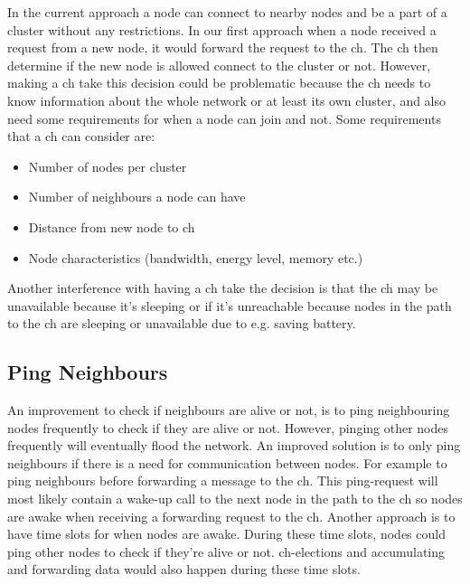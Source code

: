 \documentclass[USenglish]{uit-thesis}
\begin{document}
In the current approach a node can connect to nearby nodes and be a part of a cluster without any restrictions. In our first approach when a node received a request from a new node, it would forward the request to the \gls{ch}. The \gls{ch} then determine if the new node is allowed connect to the cluster or not. However, making a \gls{ch} take this decision could be problematic because the \gls{ch} needs to know information about the whole network or at least its own cluster, and also need some requirements for when a node can join and not. Some requirements that a \gls{ch} can consider are:

\begin{itemize}
\item Number of nodes per cluster
\item Number of neighbours a node can have
\item Distance from new node to \gls{ch}
\item Node characteristics (bandwidth, energy level, memory etc.)
\end{itemize}

Another interference with having a \gls{ch} take the decision is that the \gls{ch} may be unavailable because it's sleeping or if it's unreachable because nodes in the path to the \gls{ch} are sleeping or unavailable due to e.g. saving battery. 

\subsection{Ping Neighbours} \label{disc:ping_nodes}
An improvement to check if neighbours are alive or not, is to ping neighbouring nodes frequently to check if they are alive or not. However, pinging other nodes frequently will eventually flood the network. An improved solution is to only ping neighbours if there is a need for communication between nodes. For example to ping neighbours before forwarding a message to the \gls{ch}. This ping-request will most likely contain a wake-up call to the next node in the path to the \gls{ch} so nodes are awake when receiving a forwarding request to the \gls{ch}. Another approach is to have time slots for when nodes are awake. During these time slots, nodes could ping other nodes to check if they're alive or not. \gls{ch}-elections and accumulating and forwarding data would also happen during these time slots.
\end{document}
